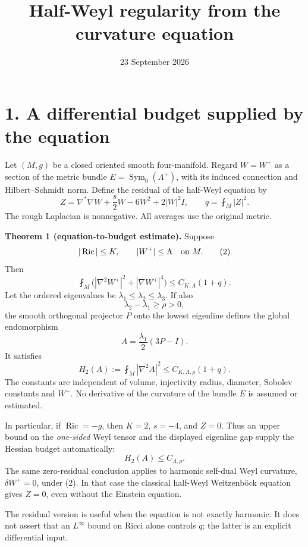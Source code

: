 \documentclass[
  11pt,
]{article}
\title{Half-Weyl regularity from the curvature equation}
\author{}
\date{23 September 2026}
\begin{document}
\maketitle

\hypertarget{a-differential-budget-supplied-by-the-equation}{%
\section{1. A differential budget supplied by the
equation}\label{a-differential-budget-supplied-by-the-equation}}

Let \((M,g)\) be a closed oriented smooth four-manifold. Regard
\(W=W^+\) as a section of the metric bundle
\(E=\operatorname{Sym}_0(\Lambda^+)\), with its induced connection and
Hilbert--Schmidt norm. Define the residual of the half-Weyl equation by
\[
 Z=\nabla^*\nabla W+\frac{s}{2}W-6W^2+2|W|^2I,
 \qquad q=\fint_M|Z|^2.
 \tag{1}
\] The rough Laplacian is nonnegative. All averages use the original
metric.

\textbf{Theorem 1 (equation-to-budget estimate).} Suppose \[
                  |\operatorname{Ric}|\le K,\qquad |W^+|\le\Lambda
                  \quad\hbox{on }M.
 \tag{2}
\] Then \[
 \boxed{\fint_M\bigl(|\nabla^2W^+|^2+|\nabla W^+|^4\bigr)
                    \le C_{K,\Lambda}(1+q).}
 \tag{3}
\] Let the ordered eigenvalues be \(\lambda_1\le\lambda_2\le\lambda_3\).
If also \[
                         \lambda_2-\lambda_1\ge\rho>0,
 \tag{4}
\] the smooth orthogonal projector \(P\) onto the lowest eigenline
defines the global endomorphism \[
 A=\frac{\lambda_1}{2}(3P-I).
 \tag{5}
\] It satisfies \[
 \boxed{H_2(A):=\fint_M|\nabla^2A|^2
                     \le C_{K,\Lambda,\rho}(1+q).}
 \tag{6}
\] The constants are independent of volume, injectivity radius,
diameter, Sobolev constants and \(W^-\). No derivative of the curvature
of the bundle \(E\) is assumed or estimated.

In particular, if \(\operatorname{Ric}=-g\), then \(K=2\), \(s=-4\), and
\(Z=0\). Thus an upper bound on the \emph{one-sided} Weyl tensor and the
displayed eigenline gap supply the Hessian budget automatically: \[
                  H_2(A)\le C_{\Lambda,\rho}.
 \tag{7}
\] The same zero-residual conclusion applies to harmonic self-dual Weyl
curvature, \(\delta W^+=0\), under (2). In that case the classical
half-Weyl Weitzenböck equation gives \(Z=0\), even without the Einstein
equation.

The residual version is useful when the equation is not exactly
harmonic. It does not assert that an \(L^\infty\) bound on Ricci alone
controls \(q\); the latter is an explicit differential input.
\end{document}
